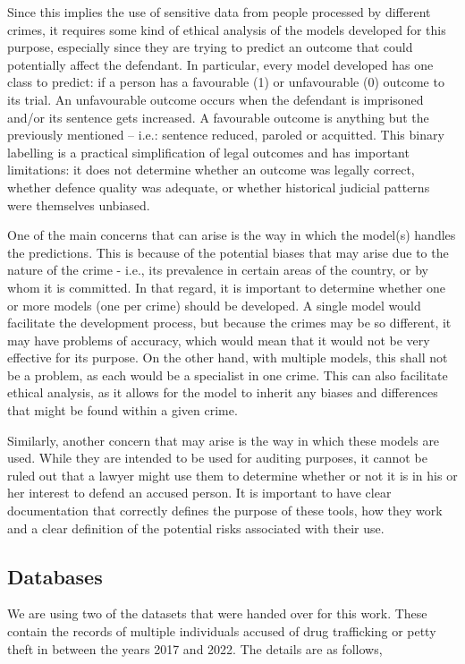 \documentclass[fleqn,10pt]{wlscirep}
\begin{document}
Since this implies the use of sensitive data from people processed by different crimes, it requires some kind of ethical analysis of the models developed for this purpose, especially since they are trying to predict an outcome that could potentially affect the defendant. In particular, every model developed has one class to predict: if a person has a favourable (1) or unfavourable (0) outcome to its trial. An unfavourable outcome occurs when the defendant is imprisoned and/or its sentence gets increased. A favourable outcome is anything but the previously mentioned -- i.e.: sentence reduced, paroled or acquitted. This binary labelling is a practical simplification of legal outcomes and has important limitations: it does not determine whether an outcome was legally correct, whether defence quality was adequate, or whether historical judicial patterns were themselves unbiased.

One of the main concerns that can arise is the way in which the model(s) handles the predictions. This is because of the potential biases that may arise due to the nature of the crime - i.e., its prevalence in certain areas of the country, or by whom it is committed. In that regard, it is important to determine whether one or more models (one per crime) should be developed. A single model would facilitate the development process, but because the crimes may be so different, it may have problems of accuracy, which would mean that it would not be very effective for its purpose. On the other hand, with multiple models, this shall not be a problem, as each would be a specialist in one crime. This can also facilitate ethical analysis, as it allows for the model to inherit any biases and differences that might be found within a given crime.

Similarly, another concern that may arise is the way in which these models are used. While they are intended to be used for auditing purposes, it cannot be ruled out that a lawyer might use them to determine whether or not it is in his or her interest to defend an accused person. It is important to have clear documentation that correctly defines the purpose of these tools, how they work and a clear definition of the potential risks associated with their use.

\subsection{Databases}\label{subsec:Databases}

We are using two of the datasets that were handed over for this work. These contain the records of multiple individuals accused of drug trafficking or petty theft in between the years 2017 and 2022. The details are as follows,
\end{document}
